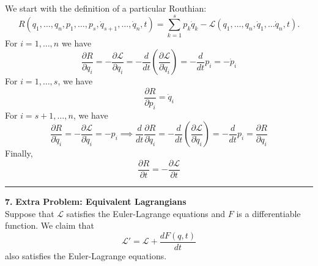 \documentclass{article}
\theoremstyle{definition}
\newcommand{\p}{\partial}
\newcommand{\lag}{\mathcal{L}}
\newcommand{\f}[2]{\frac{#1}{#2}}
\newcommand{\lp}{\left(}
\newcommand{\rp}{\right)}
\begin{document}
\noindent We start with the definition of a particular Routhian:
\begin{equation*}
R(q_1,\dots,q_n, p_1,\dots,p_s, \dot{q}_{s+1}, \dots, \dot{q}_{n},t) = \sum^s_{k=1} p_k \dot{q}_k  - \lag(q_1,\dots,q_n, \dot{q}_1,\dots \dot{q}_n,t).
\end{equation*}
For $i = 1,\dots,n$ we have
\begin{equation*}
\boxed{\f{\p R}{\p q_i}} = -\f{\p \lag}{\p q_i} = -\f{d}{dt} \lp \f{\p \lag}{\p \dot{q}_i} \rp = -\f{d}{dt}p_i = \boxed{-\dot{p}_i}
\end{equation*}
For $i=1,\dots,s$, we have
\begin{equation*}
\boxed{\f{\p R}{\p p_i} = \dot{q}_i}
\end{equation*}
For $i = s+1,\dots,n$, we have 
\begin{equation*}
\boxed{\f{\p R}{\p \dot{q}_i}} = -\f{\p \lag}{\p \dot{q}_i} = \boxed{-p_i} \implies \boxed{\f{d}{dt}\f{\p R}{\p \dot{q}_i}} = -\f{d}{dt}\lp \f{\p \lag}{\p \dot{q}_i} \rp = -\f{d}{dt} p_i = \boxed{\f{\p R}{\p q_i}}
\end{equation*}
Finally, 
\begin{equation*}
\boxed{\f{\p R}{\p t} = -\f{\p \lag}{\p t}}
\end{equation*}



\hrule

$\,$\\


\noindent \textbf{7.} \textbf{Extra Problem: Equivalent Lagrangians}\\


\noindent Suppose that $\lag$ satisfies the Euler-Lagrange equations and $F$ is a differentiable function. We claim that
\begin{equation*}
\lag' = \lag + \f{dF(q,t)}{dt}
\end{equation*}
also satisfies the Euler-Lagrange equations.
\end{document}
